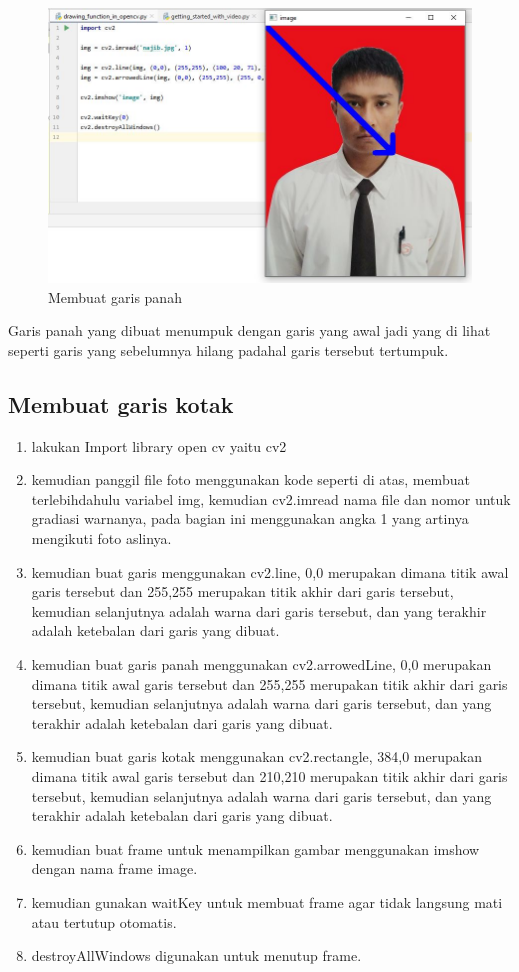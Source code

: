 \newpage
\begin{figure}[ht]
\centering
\includegraphics[scale=0.5]{figures/2,10.jpg}
\caption{Membuat garis panah}
\label{contoh}
\end{figure}

Garis panah yang dibuat menumpuk dengan garis yang awal jadi yang di lihat seperti garis yang sebelumnya hilang padahal garis tersebut tertumpuk.

\newpage
\subsection{Membuat garis kotak}

\begin{enumerate}
	\item lakukan Import library open cv yaitu cv2
	\item kemudian panggil file foto menggunakan kode seperti di atas, membuat terlebihdahulu variabel img, kemudian cv2.imread nama file dan nomor untuk gradiasi warnanya, pada bagian ini menggunakan angka 1 yang artinya mengikuti foto aslinya.
	\item kemudian buat garis menggunakan cv2.line, 0,0 merupakan dimana titik awal garis tersebut dan 255,255 merupakan titik akhir dari garis tersebut, kemudian selanjutnya adalah warna dari garis tersebut, dan yang terakhir adalah ketebalan dari garis yang dibuat.
	\item kemudian buat garis panah menggunakan cv2.arrowedLine, 0,0 merupakan dimana titik awal garis tersebut dan 255,255 merupakan titik akhir dari garis tersebut, kemudian selanjutnya adalah warna dari garis tersebut, dan yang terakhir adalah ketebalan dari garis yang dibuat.
	\item kemudian buat garis kotak menggunakan cv2.rectangle, 384,0 merupakan dimana titik awal garis tersebut dan 210,210 merupakan titik akhir dari garis tersebut, kemudian selanjutnya adalah warna dari garis tersebut, dan yang terakhir adalah ketebalan dari garis yang dibuat.
	\item kemudian buat frame untuk menampilkan gambar menggunakan imshow dengan nama frame image.
	\item kemudian gunakan waitKey untuk membuat frame agar tidak langsung mati atau tertutup otomatis.
	\item destroyAllWindows digunakan untuk menutup frame.
\end{enumerate}

